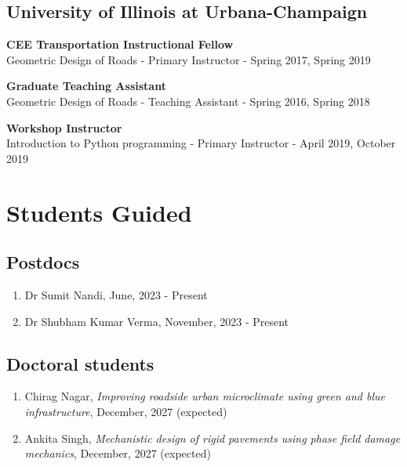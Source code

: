 \documentclass[12pt]{article}
\begin{document}
\hfill
\subsection*{University of Illinois at Urbana-Champaign}
\textbf{CEE Transportation Instructional Fellow}\\
Geometric Design of Roads - Primary Instructor - Spring 2017, Spring 2019

\textbf{Graduate Teaching Assistant}\\
Geometric Design of Roads - Teaching Assistant - Spring 2016, Spring 2018

\textbf{Workshop Instructor}\\
Introduction to Python programming - Primary Instructor - April 2019, October 2019

\bigskip
\section*{Students Guided}
\hfill
\subsection*{Postdocs}
\begin{enumerate}
	\item Dr Sumit Nandi, June, 2023 - Present
	\item Dr Shubham Kumar Verma, November, 2023 - Present
\end{enumerate}

\hfill
\subsection*{Doctoral students}
\begin{enumerate}
	\item Chirag Nagar, \textit{Improving roadside urban microclimate using green and blue infrastructure}, December, 2027 (expected)
	\item Ankita Singh, \textit{Mechanistic design of rigid pavements using phase field damage mechanics}, December, 2027 (expected)
\end{enumerate}

\hfill
\end{document}
